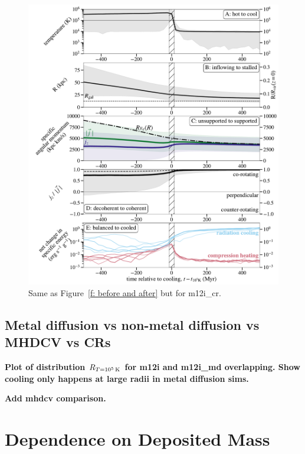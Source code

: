 \documentclass[fleqn,usenatbib]{mnras}
\newcommand{\Rcon}{R_{T=10^5\,{\rm K}}}
\begin{document}
\begin{figure}
\includegraphics[width=\textwidth]{figures/before_vs_after_cr.pdf}
\caption{
Same as Figure~\ref{f: before and after} but for m12i\_cr.
}
\label{f: before and after cr}
\end{figure}

\subsection{Metal diffusion vs non-metal diffusion vs MHDCV vs CRs}

\textbf{Plot of distribution $\Rcon$ for m12i and m12i\_md overlapping. Show cooling only happens at large radii in metal diffusion sims.}

\textbf{Add mhdcv comparison.}

\section{Dependence on Deposited Mass}
\end{document}
